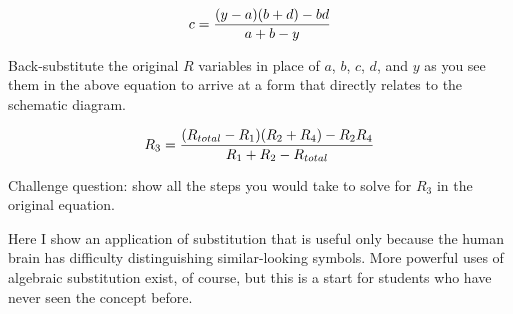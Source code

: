 $$c = {{(y-a)(b+d) - bd}\over {a + b - y}}$$

Back-substitute the original $R$ variables in place of $a$, $b$, $c$, $d$, and $y$ as you see them in the above equation to arrive at a form that directly relates to the schematic diagram.







$$R_3 = {{(R_{total}-R_1)(R_2 + R_4) - R_2 R_4}\over {R_1 + R_2 - R_{total}}}$$

\vskip 10pt

Challenge question: show all the steps you would take to solve for $R_3$ in the original equation.







Here I show an application of substitution that is useful only because the human brain has difficulty distinguishing similar-looking symbols.  More powerful uses of algebraic substitution exist, of course, but this is a start for students who have never seen the concept before.




